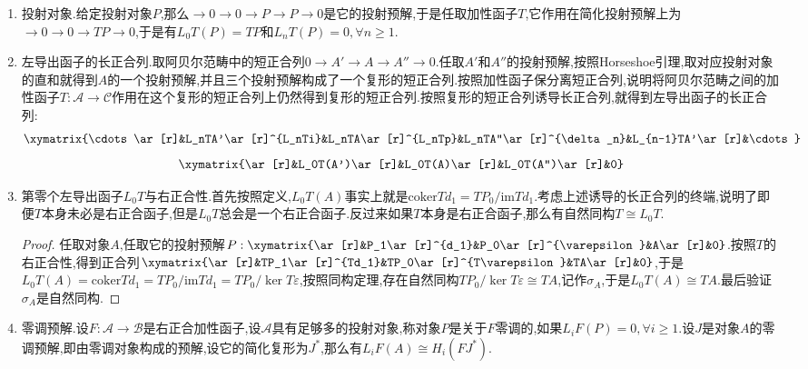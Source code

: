 \begin{enumerate}
\begin{proof}
		现在假设已经构造了$P_0,P_1,\cdots,P_n$使得从下数前$n$行构成的图表交换,并且$K_n'=\ker d_n'$,$K_n=\ker d_n$和$K_n''=\ker d_n''$,模仿初始步骤的证明,取$P_{n+1}=P_{n+1}'\oplus P_{n+1}''$会得到如下交换图,满足所有行与所有列都是短正合列,这就构造出了$A$的投射预解以及预解之间的提升了$i$和$q$的链映射.
		$$\xymatrix{&0\ar[d]&0\ar[d]&0\ar[d]&\\0\ar[r]&K_{n+1}'\ar[r]\ar[d]&K_{n+1}\ar[r]\ar[d]&K_{n+1}''\ar[r]\ar[d]&0\\0\ar[r]&P_{n+1}'\ar[r]\ar[d]&P_{n+1}\ar[r]\ar[d]&P_{n+1}''\ar[r]\ar[d]&0\\0\ar[r]&K_n'\ar[r]\ar[d]&K_n\ar[r]\ar[d]&K_n''\ar[d]\ar[r]&0\\&0&0&0&}$$
	\end{proof}
    \item 投射对象.给定投射对象$P$,那么$\to0\to0\to P\to P\to0$是它的投射预解,于是任取加性函子$T$,它作用在简化投射预解上为$\to0\to0\to TP\to0$,于是有$L_0T(P)=TP$和$L_nT(P)=0,\forall n\ge1$.
    \item 左导出函子的长正合列.取阿贝尔范畴中的短正合列$0\to A'\to A\to A''\to0$.任取$A'$和$A''$的投射预解,按照Horseshoe引理,取对应投射对象的直和就得到$A$的一个投射预解,并且三个投射预解构成了一个复形的短正合列.按照加性函子保分离短正合列,说明将阿贝尔范畴之间的加性函子$T:\mathscr{A}\to\mathscr{C}$作用在这个复形的短正合列上仍然得到复形的短正合列.按照复形的短正合列诱导长正合列,就得到左导出函子的长正合列:
    $$\xymatrix{\cdots\ar[r]&L_nTA'\ar[r]^{L_nTi}&L_nTA\ar[r]^{L_nTp}&L_nTA''\ar[r]^{\delta_n}&L_{n-1}TA'\ar[r]&\cdots}$$
    $$\xymatrix{\ar[r]&L_0T(A')\ar[r]&L_0T(A)\ar[r]&L_0T(A'')\ar[r]&0}$$
    \item 第零个左导出函子$L_0T$与右正合性.首先按照定义,$L_0T(A)$事实上就是$\mathrm{coker}Td_1=TP_0/\mathrm{im}Td_1$.考虑上述诱导的长正合列的终端,说明了即便$T$本身未必是右正合函子,但是$L_0T$总会是一个右正合函子.反过来如果$T$本身是右正合函子,那么有自然同构$T\cong L_0T$.
    \begin{proof}
    	
    	任取对象$A$,任取它的投射预解$P:\xymatrix{\ar[r]&P_1\ar[r]^{d_1}&P_0\ar[r]^{\varepsilon}&A\ar[r]&0}$.按照$T$的右正合性,得到正合列$\xymatrix{\ar[r]&TP_1\ar[r]^{Td_1}&TP_0\ar[r]^{T\varepsilon}&TA\ar[r]&0}$,于是$L_0T(A)=\mathrm{coker}Td_1=TP_0/\mathrm{im}Td_1=TP_0/\ker T\varepsilon$,按照同构定理,存在自然同构$TP_0/\ker T\varepsilon\cong TA$,记作$\sigma_A$,于是$L_0T(A)\cong TA$.最后验证$\sigma_A$是自然同构.
    \end{proof}
    \item 零调预解.设$F:\mathscr{A}\to\mathscr{B}$是右正合加性函子,设$\mathscr{A}$具有足够多的投射对象,称对象$P$是关于$F$零调的,如果$L_iF(P)=0,\forall i\ge1$.设$J$是对象$A$的零调预解,即由零调对象构成的预解,设它的简化复形为$J^*$,那么有$L_iF(A)\cong H_i(FJ^*)$.
\end{enumerate}


